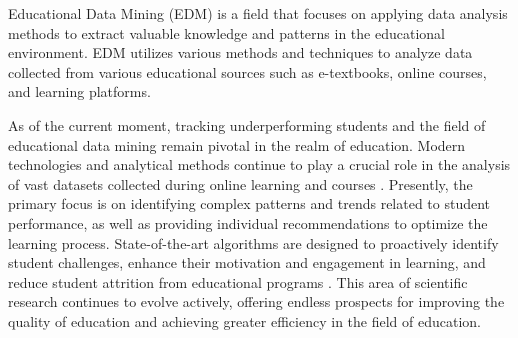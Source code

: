 \documentclass{article}
\begin{document}
\begin{multicols}{2}
\begin{justify}
      Educational Data Mining (EDM) is a field that focuses on applying data analysis methods to extract valuable knowledge and patterns in the educational environment. EDM utilizes various methods and techniques to analyze data collected from various educational sources such as e-textbooks, online courses, and learning platforms.

      As of the current moment, tracking underperforming students and the field of educational data mining remain pivotal in the realm of education. Modern technologies and analytical methods continue to play a crucial role in the analysis of vast datasets collected during online learning and courses \cite{1}. Presently, the primary focus is on identifying complex patterns and trends related to student performance, as well as providing individual recommendations to optimize the learning process. State-of-the-art algorithms are designed to proactively identify student challenges, enhance their motivation and engagement in learning, and reduce student attrition from educational programs \cite{2}. This area of scientific research continues to evolve actively, offering endless prospects for improving the quality of education and achieving greater efficiency in the field of education.


\end{justify}
\end{multicols}
\end{document}
